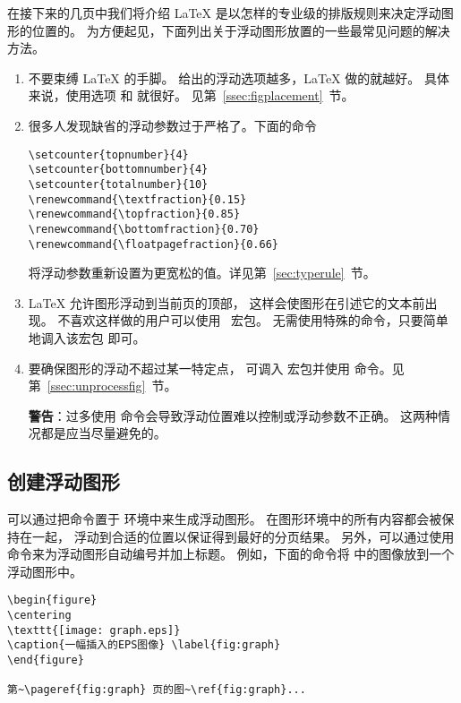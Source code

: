 在接下来的几页中我们将介绍 \LaTeX{} 是以怎样的专业级的排版规则来决定浮动图形的位置的。
为方便起见，下面列出关于浮动图形放置的一些最常见问题的解决方法。
\begin{enumerate}
	\item 不要束缚 \LaTeX{} 的手脚。
	给出的浮动选项越多，\LaTeX{} 做的就越好。
	具体来说，使用选项 \opt{[htbp]} 和 \opt{[tbp]}	就很好。
	见第~\ref{ssec:figplacement}~节。
	
	\item 很多人发现缺省的浮动参数过于严格了。下面的命令
\begin{lstlisting}
\setcounter{topnumber}{4}
\setcounter{bottomnumber}{4}
\setcounter{totalnumber}{10}
\renewcommand{\textfraction}{0.15}
\renewcommand{\topfraction}{0.85}
\renewcommand{\bottomfraction}{0.70}
\renewcommand{\floatpagefraction}{0.66}
\end{lstlisting}
	将浮动参数重新设置为更宽松的值。详见第~\ref{sec:typerule}~节。
	
	\item \LaTeX{} 允许图形浮动到当前页的顶部，
	这样会使图形在引述它的文本前出现。
	不喜欢这样做的用户可以使用~ 宏包。
	无需使用特殊的命令，只要简单地调入该宏包  即可。
	
	\item 要确保图形的浮动不超过某一特定点，
	可调入  宏包并使用  命令。见第~\ref{ssec:unprocessfig}~节。
	
	\textbf{警告}：过多使用 	命令会导致浮动位置难以控制或浮动参数不正确。
	这两种情况都是应当尽量避免的。
\end{enumerate}

\subsection{创建浮动图形}\label{ssec:createfloatfig}
可以通过把命令置于  环境中来生成浮动图形。
在图形环境中的所有内容都会被保持在一起，
浮动到合适的位置以保证得到最好的分页结果。
另外，可以通过使用  命令来为浮动图形自动编号并加上标题。
例如，下面的命令将  中的图像放到一个浮动图形中。
\begin{lstlisting}
\begin{figure} 
\centering 
\texttt{[image: graph.eps]} 
\caption{一幅插入的EPS图像} \label{fig:graph} 
\end{figure}

第~\pageref{fig:graph} 页的图~\ref{fig:graph}...
\end{lstlisting}

